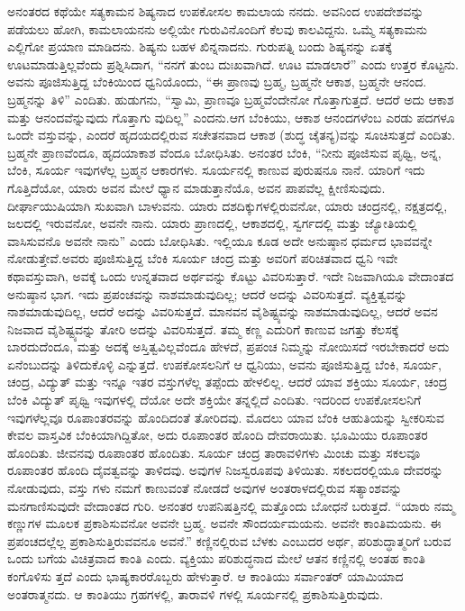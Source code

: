 ಅನಂತರದ ಕಥೆಯೇ ಸತ್ಯಕಾಮನ ಶಿಷ್ಯನಾದ ಉಪಕೋಸಲ ಕಾಮಲಾಯ ನನದು. ಅವನಿಂದ ಉಪದೇಶವನ್ನು ಪಡೆಯಲು ಹೋಗಿ, ಕಾಮಲಾಯನನು ಅಲ್ಲಿಯೇ ಗುರುವಿನೊಂದಿಗೆ ಕೆಲವು ಕಾಲವಿದ್ದನು. ಒಮ್ಮೆ ಸತ್ಯಕಾಮನು ಎಲ್ಲಿಗೋ ಪ್ರಯಾಣ ಮಾಡಿದನು. ಶಿಷ್ಯನು ಬಹಳ ಖಿನ್ನನಾದನು. ಗುರುಪತ್ನಿ ಬಂದು ಶಿಷ್ಯನನ್ನು ಏತಕ್ಕೆ ಊಟಮಾಡುತ್ತಿಲ್ಲವೆಂದು ಪ್ರಶ್ನಿಸಿದಾಗ, “ನನಗೆ ತುಂಬ ದುಃಖವಾಗಿದೆ. ಊಟ ಮಾಡಲಾರೆ” ಎಂದು ಉತ್ತರ ಕೊಟ್ಟನು. ಅವನು ಪೂಜಿಸುತ್ತಿದ್ದ ಬೆಂಕಿಯಿಂದ ಧ್ವನಿಯೊಂದು, “ಈ ಪ್ರಾಣವು ಬ್ರಹ್ಮ, ಬ್ರಹ್ಮನೇ ಆಕಾಶ, ಬ್ರಹ್ಮನೇ ಆನಂದ. ಬ್ರಹ್ಮನನ್ನು ತಿಳಿ” ಎಂದಿತು. ಹುಡುಗನು, “ಸ್ವಾಮಿ, ಪ್ರಾಣವೂ ಬ್ರಹ್ಮವೆಂದೇನೋ ಗೊತ್ತಾಗುತ್ತದೆ. ಆದರೆ ಅದು ಆಕಾಶ ಮತ್ತು ಆನಂದವೆನ್ನುವುದು ಗೊತ್ತಾಗು ವುದಿಲ್ಲ” ಎಂದನು.ಆಗ ಬೆಂಕಿಯು, ಆಕಾಶ ಆನಂದಗಳೆಂಬ ಎರಡು ಪದಗಳೂ ಒಂದೇ ವಸ್ತುವನ್ನು, ಎಂದರೆ ಹೃದಯದಲ್ಲಿರುವ ಸಚೇತನವಾದ ಆಕಾಶ (ಶುದ್ಧ ಚೈತನ್ಯ)ವನ್ನು ಸೂಚಿಸುತ್ತದೆ ಎಂದಿತು. ಬ್ರಹ್ಮನೇ ಪ್ರಾಣವೆಂದೂ, ಹೃದಯಾಕಾಶ ವೆಂದೂ ಬೋಧಿಸಿತು. ಅನಂತರ ಬೆಂಕಿ, “ನೀನು ಪೂಜಿಸುವ ಪೃಥ್ವಿ, ಅನ್ನ, ಬೆಂಕಿ, ಸೂರ್ಯ ಇವುಗಳೆಲ್ಲ ಬ್ರಹ್ಮನ ಆಕಾರಗಳು. ಸೂರ್ಯನಲ್ಲಿ ಕಾಣುವ ಪುರುಷನೂ ನಾನೆ. ಯಾರಿಗೆ ಇದು ಗೊತ್ತಿದೆಯೋ, ಯಾರು ಅವನ ಮೇಲೆ ಧ್ಯಾನ ಮಾಡುತ್ತಾನೆಯೊ, ಅವನ ಪಾಪವೆಲ್ಲ ಕ್ಷೀಣಿಸುವುದು. ದೀರ್ಘಾಯುಷಿಯಾಗಿ ಸುಖವಾಗಿ ಬಾಳುವನು. ಯಾರು ದಶದಿಕ್ಕುಗಳಲ್ಲಿರುವನೋ, ಯಾರು ಚಂದ್ರನಲ್ಲಿ, ನಕ್ಷತ್ರದಲ್ಲಿ, ಜಲದಲ್ಲಿ ಇರುವನೋ, ಅವನೇ ನಾನು. ಯಾರು ಪ್ರಾಣದಲ್ಲಿ, ಆಕಾಶದಲ್ಲಿ, ಸ್ವರ್ಗದಲ್ಲಿ ಮತ್ತು ಜ್ಯೋತಿಯಲ್ಲಿ ವಾಸಿಸುವನೊ ಅವನೇ ನಾನು” ಎಂದು ಬೋಧಿಸಿತು. ಇಲ್ಲಿಯೂ ಕೂಡ ಅದೇ ಅನುಷ್ಠಾನ ಧರ್ಮದ ಭಾವವನ್ನೇ ನೋಡುತ್ತೇವೆ.ಅವರು ಪೂಜಿಸುತ್ತಿದ್ದ ಬೆಂಕಿ ಸೂರ್ಯ ಚಂದ್ರ ಮತ್ತು ಅವರಿಗೆ ಪರಿಚಿತವಾದ ಧ್ವನಿ ಇವೇ ಕಥಾವಸ್ತುವಾಗಿ, ಅವಕ್ಕೆ ಒಂದು ಉನ್ನತವಾದ ಅರ್ಥವನ್ನು ಕೊಟ್ಟು ವಿವರಿಸುತ್ತಾರೆ. ಇದೇ ನಿಜವಾಗಿಯೂ ವೇದಾಂತದ ಅನುಷ್ಠಾನ ಭಾಗ. ಇದು ಪ್ರಪಂಚವನ್ನು ನಾಶಮಾಡುವುದಿಲ್ಲ; ಆದರೆ ಅದನ್ನು ವಿವರಿಸುತ್ತದೆ. ವ್ಯಕ್ತಿತ್ವವನ್ನು ನಾಶಮಾಡುವುದಿಲ್ಲ, ಆದರೆ ಅದನ್ನು ವಿವರಿಸುತ್ತದೆ. ಮಾನವನ ವೈಶಿಷ್ಟ್ಯವನ್ನು ನಾಶಮಾಡುವುದಿಲ್ಲ, ಆದರೆ ಅವನ ನಿಜವಾದ ವೈಶಿಷ್ಟ್ಯವನ್ನು ತೋರಿ ಅದನ್ನು ವಿವರಿಸುತ್ತದೆ. ತಮ್ಮ ಕಣ್ಣ ಎದುರಿಗೆ ಕಾಣುವ ಜಗತ್ತು ಕೆಲಸಕ್ಕೆ ಬಾರದುದೆಂದೂ, ಮತ್ತು ಅದಕ್ಕೆ ಅಸ್ತಿತ್ವವಿಲ್ಲವೆಂದೂ ಹೇಳದೆ, ಪ್ರಪಂಚ ನಿಮ್ಮನ್ನು ನೋಯಿಸದೆ ಇರಬೇಕಾದರೆ ಅದು ಏನೆಂಬುದನ್ನು ತಿಳಿದುಕೊಳ್ಳಿ ಎನ್ನುತ್ತದೆ. ಉಪಕೋಸಲನಿಗೆ ಆ ಧ್ವನಿಯು, ಅವನು ಪೂಜಿಸುತ್ತಿದ್ದ ಬೆಂಕಿ, ಸೂರ್ಯ, ಚಂದ್ರ, ವಿದ್ಯುತ್​ ಮತ್ತು ಇನ್ನೂ ಇತರ ವಸ್ತುಗಳೆಲ್ಲ ತಪ್ಪೆಂದು ಹೇಳಲಿಲ್ಲ. ಆದರೆ ಯಾವ ಶಕ್ತಿಯು ಸೂರ್ಯ, ಚಂದ್ರ ಬೆಂಕಿ ವಿದ್ಯುತ್​ ಪೃಥ್ವಿ ಇವುಗಳಲ್ಲಿ ದೆಯೋ ಅದೇ ಶಕ್ತಿಯೇ ತನ್ನಲ್ಲಿದೆ ಎಂದಿತು. ಇದರಿಂದ ಉಪಕೋಸಲನಿಗೆ ಇವುಗಳೆಲ್ಲವೂ ರೂಪಾಂತರವನ್ನು ಹೊಂದಿದಂತೆ ತೋರಿದವು. ಮೊದಲು ಯಾವ ಬೆಂಕಿ ಆಹುತಿಯನ್ನು ಸ್ವೀಕರಿಸುವ ಕೇವಲ ವಾಸ್ತವಿಕ ಬೆಂಕಿಯಾಗಿದ್ದಿತೋ, ಅದು ರೂಪಾಂತರ ಹೊಂದಿ ದೇವರಾಯಿತು. ಭೂಮಿಯು ರೂಪಾಂತರ ಹೊಂದಿತು. ಜೀವನವು ರೂಪಾಂತರ ಹೊಂದಿತು. ಸೂರ್ಯ ಚಂದ್ರ ತಾರಾವಳಿಗಳು ಮಿಂಚು ಮತ್ತು ಸಕಲವೂ ರೂಪಾಂತರ ಹೊಂದಿ ದೈವತ್ವವನ್ನು ತಾಳಿದವು. ಅವುಗಳ ನಿಜಸ್ವರೂಪವು ತಿಳಿಯಿತು. ಸಕಲದರಲ್ಲಿಯೂ ದೇವರನ್ನು ನೋಡುವುದು, ವಸ್ತು ಗಳು ನಮಗೆ ಕಾಣುವಂತೆ ನೋಡದೆ ಅವುಗಳ ಅಂತರಾಳದಲ್ಲಿರುವ ಸತ್ಯಾಂಶವನ್ನು ಮನಗಾಣಿಸುವುದೇ ವೇದಾಂತದ ಗುರಿ. ಅನಂತರ ಉಪನಿಷತ್ತಿನಲ್ಲಿ ಮತ್ತೊಂದು ಬೋಧನೆ ಬರುತ್ತದೆ. “ಯಾರು ನಮ್ಮ ಕಣ್ಣುಗಳ ಮೂಲಕ ಪ್ರಕಾಶಿಸುವನೋ ಅವನೇ ಬ್ರಹ್ಮ. ಅವನೇ ಸೌಂದರ್ಯಮಯನು. ಅವನೇ ಕಾಂತಿಮಯನು. ಈ ಪ್ರಪಂಚದಲ್ಲೆಲ್ಲ ಪ್ರಕಾಶಿಸುತ್ತಿರುವವನೂ ಅವನೆ.” ಕಣ್ಣಿನಲ್ಲಿರುವ ಬೆಳಕು ಎಂಬುದರ ಅರ್ಥ, ಪರಿಶುದ್ಧಾತ್ಮರಿಗೆ ಬರುವ ಒಂದು ಬಗೆಯ ವಿಚಿತ್ರವಾದ ಕಾಂತಿ ಎಂದು. ವ್ಯಕ್ತಿಯು ಪರಿಶುದ್ಧನಾದ ಮೇಲೆ ಆತನ ಕಣ್ಣಿನಲ್ಲಿ ಅಂತಹ ಕಾಂತಿ ಕಂಗೊಳಿಸು ತ್ತದೆ ಎಂದು ಭಾಷ್ಯಕಾರರೊಬ್ಬರು ಹೇಳುತ್ತಾರೆ. ಆ ಕಾಂತಿಯು ಸರ್ವಾಂತರ್ ಯಾಮಿಯಾದ ಅಂತರಾತ್ಮನದು. ಆ ಕಾಂತಿಯು ಗ್ರಹಗಳಲ್ಲಿ, ತಾರಾವಳಿ ಗಳಲ್ಲಿ ಸೂರ್ಯನಲ್ಲಿ ಪ್ರಕಾಶಿಸುತ್ತಿರುವುದು.

